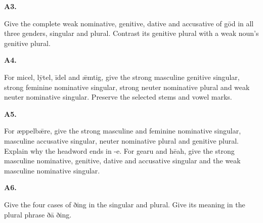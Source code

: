 \par\begin{minipage}{\linewidth}\raggedright
\textbf{A3.}

Give the complete weak nominative, genitive, dative and accusative of gōd in all three genders, singular and plural. Contrast its genitive plural with a weak noun’s genitive plural.

\end{minipage}\par\addvspace{4pt}

\par\begin{minipage}{\linewidth}\raggedright
\textbf{A4.}

For micel, lȳtel, īdel and ǣmtig, give the strong masculine genitive singular, strong feminine nominative singular, strong neuter nominative plural and weak neuter nominative singular. Preserve the selected stems and vowel marks.

\end{minipage}\par\addvspace{4pt}

\par\begin{minipage}{\linewidth}\raggedright
\textbf{A5.}

For æppelbǣre, give the strong masculine and feminine nominative singular, masculine accusative singular, neuter nominative plural and genitive plural. Explain why the headword ends in -e. For gearu and hēah, give the strong masculine nominative, genitive, dative and accusative singular and the weak masculine nominative singular.

\end{minipage}\par\addvspace{4pt}

\par\begin{minipage}{\linewidth}\raggedright
\textbf{A6.}

Give the four cases of ðing in the singular and plural. Give its meaning in the plural phrase ðā ðing.

\end{minipage}\par\addvspace{4pt}

